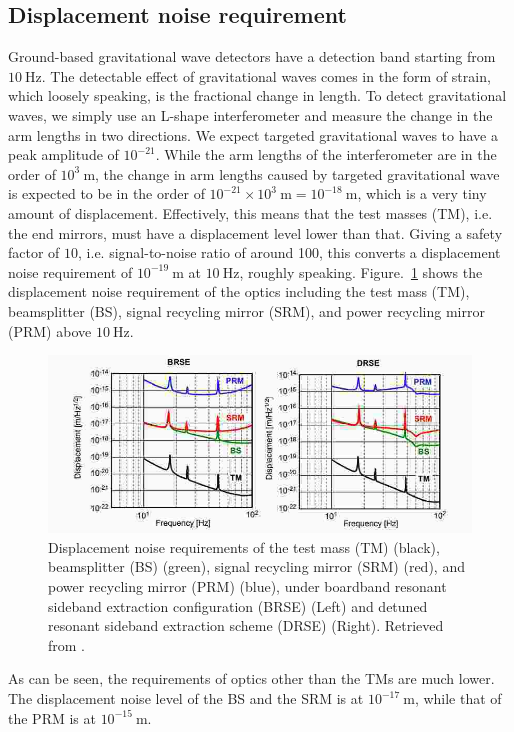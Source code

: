 \subsection{Displacement noise requirement}
Ground-based gravitational wave detectors have a detection band starting from $10~\mathrm{Hz}$.
The detectable effect of gravitational waves comes in the form of strain, which loosely speaking, is the fractional change in length.
To detect gravitational waves, we simply use an L-shape interferometer and measure the change in the arm lengths in two directions.
We expect targeted gravitational waves to have a peak amplitude of $10^{-21}$.
While the arm lengths of the interferometer are in the order of $10^{3}~\mathrm{m}$, the change in arm lengths caused by targeted gravitational wave is expected to be in the order of $10^{-21}\times 10^{3}~\mathrm{m}=10^{-18}~\mathrm{m}$, which is a very tiny amount of displacement.
Effectively, this means that the test masses (TM), i.e. the end mirrors, must have a displacement level lower than that.
Giving a safety factor of $10$, i.e. signal-to-noise ratio of around 100, this converts a displacement noise requirement of $10^{-19}~\mathrm{m}$ at $10~\mathrm{Hz}$, roughly speaking. Figure.~\ref{fig:displacementnoiserequirement} shows the displacement noise requirement of the optics including the test mass (TM), beamsplitter (BS), signal recycling mirror (SRM), and power recycling mirror (PRM) above $10~\mathrm{Hz}$.
\begin{figure}[!h]
	\centering
	\includegraphics[width=0.7\linewidth]{figures/displacement_noise_requirement}
	\caption{Displacement noise requirements of the test mass (TM) (black), beamsplitter (BS) (green), signal recycling mirror (SRM) (red), and power recycling mirror (PRM) (blue), under boardband resonant sideband extraction configuration (BRSE) (Left) and detuned resonant sideband extraction scheme (DRSE) (Right). Retrieved from \cite{Sekiguchi:2016bmv}.}
	\label{fig:displacementnoiserequirement}
\end{figure}
As can be seen, the requirements of optics other than the TMs are much lower.
The displacement noise level of the BS and the SRM is at $10^{-17}~\mathrm{m}$, while that of the PRM is at $10^{-15}~\mathrm{m}$.

